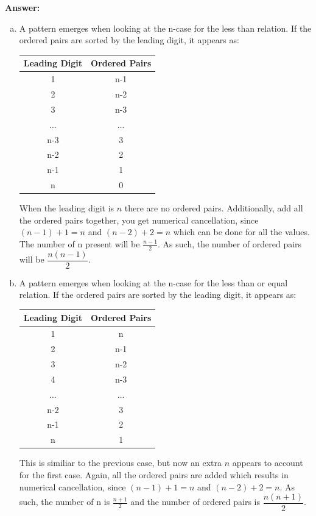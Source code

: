 \documentclass{article}
\theoremstyle{plain}
\begin{document}
\textbf{Answer:}
\begin{enumerate}[(a)]
    \item A pattern emerges when looking at the n-case for the less than relation. If the ordered pairs are sorted by the leading digit, it appears as:
    \begin{center}
    \begin{tabular}{c|c}
        Leading Digit & Ordered Pairs \\
        \hline
        1 & n-1 \\
        2 & n-2 \\
        3 & n-3 \\
        $\dots$ & $\dots$ \\
        n-3 & 3 \\
        n-2 & 2 \\
        n-1 & 1 \\
        n & 0
    \end{tabular}
    \end{center}
    When the leading digit is $n$ there are no ordered pairs. Additionally, add all the ordered pairs together, you get numerical cancellation, since $(n-1)+1=n$ and $(n-2)+2=n$ which can be done for all the values. The number of n present will be $\frac{n-1}{2}$. As such, the number of ordered pairs will be $\dfrac{n(n-1)}{2}$.
    \item A pattern emerges when looking at the n-case for the less than or equal relation. If the ordered pairs are sorted by the leading digit, it appears as:
    \begin{center}
    \begin{tabular}{c|c}
        Leading Digit & Ordered Pairs \\
        \hline
        1 & n \\
        2 & n-1 \\
        3 & n-2 \\
        4 & n-3 \\
        $\dots$ & $\dots$ \\
        n-2 & 3 \\
        n-1 & 2 \\
        n & 1
    \end{tabular}
    \end{center}
    This is similiar to the previous case, but now an extra $n$ appears to account for the first case. Again, all the ordered pairs are added which results in numerical cancellation, since $(n-1)+1=n$ and $(n-2)+2=n$. As such, the number of n is $\frac{n+1}{2}$ and the number of ordered pairs is $\dfrac{n(n+1)}{2}$.
\end{enumerate}
\end{document}
